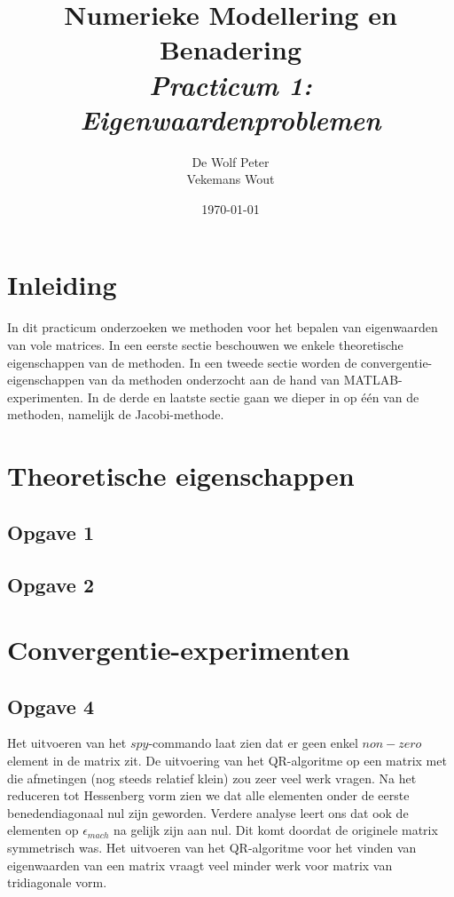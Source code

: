 \documentclass[a4paper, 12pt, titlepage]{report}
\begin{document}
\title{\textbf{Numerieke Modellering en Benadering}\\\textit{Practicum 1: Eigenwaardenproblemen}\\}
\author{De Wolf Peter\\ Vekemans Wout}

\date{\today}
\begin{titlepage}
	\maketitle
	\thispagestyle{empty}
\end{titlepage}

\newpage

\listoffigures

\newpage

\section{Inleiding}
In dit practicum onderzoeken we methoden voor het bepalen van eigenwaarden van vole matrices. In een eerste sectie beschouwen we enkele theoretische eigenschappen van de methoden. In een tweede sectie worden de convergentie-eigenschappen van da methoden onderzocht aan de hand van MATLAB-experimenten. In de derde en laatste sectie gaan we dieper in op \'e\'en van de methoden, namelijk de Jacobi-methode.
\section{Theoretische eigenschappen}

\subsection{Opgave 1}

\subsection{Opgave 2}

\section{Convergentie-experimenten}

\subsection{Opgave 4}
Het uitvoeren van het $spy$-commando laat zien dat er geen enkel $non-zero$ element in de matrix zit. De uitvoering van het QR-algoritme op een matrix met die afmetingen (nog steeds relatief klein) zou zeer veel werk vragen. Na het reduceren tot Hessenberg vorm zien we dat alle elementen onder de eerste benedendiagonaal nul zijn geworden. Verdere analyse leert ons dat ook de elementen op $\epsilon_{mach}$ na gelijk zijn aan nul. Dit komt doordat de originele matrix symmetrisch was. Het uitvoeren van het QR-algoritme voor het vinden van eigenwaarden van een matrix vraagt veel minder werk voor matrix van tridiagonale vorm.
\end{document}
